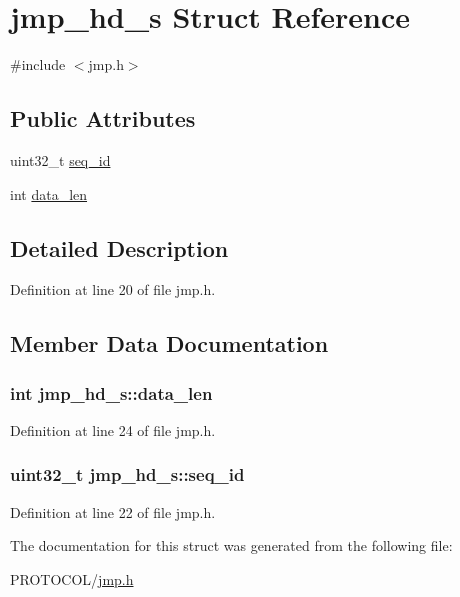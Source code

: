 \hypertarget{structjmp__hd__s}{\section{jmp\-\_\-hd\-\_\-s Struct Reference}
\label{structjmp__hd__s}
}


{\ttfamily \#include $<$jmp.\-h$>$}

\subsection*{Public Attributes}
\begin{DoxyCompactItemize}
\item 
uint32\-\_\-t \hyperlink{structjmp__hd__s_a1fc7b7d49b194711f9618be92bb270c4}{seq\-\_\-id}
\item 
int \hyperlink{structjmp__hd__s_a8c26c653e413e3954d8b04c8161f5349}{data\-\_\-len}
\end{DoxyCompactItemize}


\subsection{Detailed Description}


Definition at line 20 of file jmp.\-h.



\subsection{Member Data Documentation}
\hypertarget{structjmp__hd__s_a8c26c653e413e3954d8b04c8161f5349}{
\subsubsection[{data\-\_\-len}]{\setlength{\rightskip}{0pt plus 5cm}int jmp\-\_\-hd\-\_\-s\-::data\-\_\-len}}\label{structjmp__hd__s_a8c26c653e413e3954d8b04c8161f5349}


Definition at line 24 of file jmp.\-h.

\hypertarget{structjmp__hd__s_a1fc7b7d49b194711f9618be92bb270c4}{
\subsubsection[{seq\-\_\-id}]{\setlength{\rightskip}{0pt plus 5cm}uint32\-\_\-t jmp\-\_\-hd\-\_\-s\-::seq\-\_\-id}}\label{structjmp__hd__s_a1fc7b7d49b194711f9618be92bb270c4}


Definition at line 22 of file jmp.\-h.



The documentation for this struct was generated from the following file\-:\begin{DoxyCompactItemize}
\item 
P\-R\-O\-T\-O\-C\-O\-L/\hyperlink{jmp_8h}{jmp.\-h}\end{DoxyCompactItemize}
